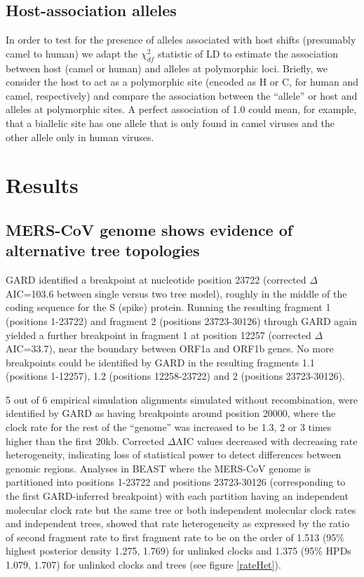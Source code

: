 \documentclass[11pt,oneside,letterpaper]{article}
\begin{document}
\subsection*{Host-association alleles}
In order to test for the presence of alleles associated with host shifts (presumably camel to human) we adapt the $\chi^{2}_{df}$ \citep{zhao2005} statistic of LD to estimate the association between host (camel or human) and alleles at polymorphic loci.
Briefly, we consider the host to act as a polymorphic site (encoded as H or C, for human and camel, respectively) and compare the association between the ``allele'' or host and alleles at polymorphic sites.
A perfect association of 1.0 could mean, for example, that a biallelic site has one allele that is only found in camel viruses and the other allele only in human viruses.

\section*{Results}
\subsection*{MERS-CoV genome shows evidence of alternative tree topologies}
GARD identified a breakpoint at nucleotide position 23722 (corrected $\Delta$AIC=103.6 between single versus two tree model), roughly in the middle of the coding sequence for the S (spike) protein.
Running the resulting fragment 1 (positions 1-23722) and fragment 2 (positions 23723-30126) through GARD again yielded a further breakpoint in fragment 1 at position 12257 (corrected $\Delta$AIC=33.7), near the boundary between ORF1a and ORF1b genes.
No more breakpoints could be identified by GARD in the resulting fragments 1.1 (positions 1-12257), 1.2 (positions 12258-23722) and 2 (positions 23723-30126).

5 out of 6 empirical simulation alignments simulated without recombination, were identified by GARD as having breakpoints around position 20000, where the clock rate for the rest of the ``genome'' was increased to be 1.3, 2 or 3 times higher than the first 20kb.
Corrected $\Delta$AIC values decreased with decreasing rate heterogeneity, indicating loss of statistical power to detect differences between genomic regions.
Analyses in BEAST where the MERS-CoV genome is partitioned into positions 1-23722 and positions 23723-30126 (corresponding to the first GARD-inferred breakpoint) with each partition having an independent molecular clock rate but the same tree or both independent molecular clock rates and independent trees, showed that rate heterogeneity as expressed by the ratio of second fragment rate to first fragment rate to be on the order of 1.513 (95\% highest posterior density 1.275, 1.769) for unlinked clocks and 1.375 (95\% HPDs 1.079, 1.707) for unlinked clocks and trees (see figure \ref{rateHet}).
\end{document}
